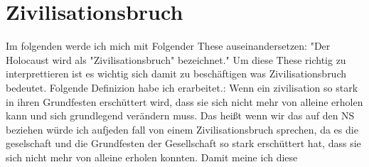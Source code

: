 \documentclass{article}
\begin{document}
\newpage

\section{Zivilisationsbruch}
Im folgenden werde ich mich mit Folgender These auseinandersetzen: "Der Holocaust wird als "Zivilisationsbruch" bezeichnet."
Um diese These richtig zu interprettieren ist es wichtig sich damit zu beschäftigen was Zivilisationsbruch bedeutet. Folgende Definizion habe
ich erarbeitet.: Wenn ein zivilisation so stark in ihren Grundfesten erschüttert wird, dass sie sich nicht mehr von alleine erholen kann
und sich grundlegend verändern muss. Das heißt wenn wir das auf den NS beziehen würde ich aufjeden fall von einem Zivilisationsbruch sprechen,
da es die geselschaft und die Grundfesten der Gesellschaft so stark erschüttert hat, dass sie sich nicht mehr von alleine erholen konnten.
Damit meine ich diese
\end{document}
